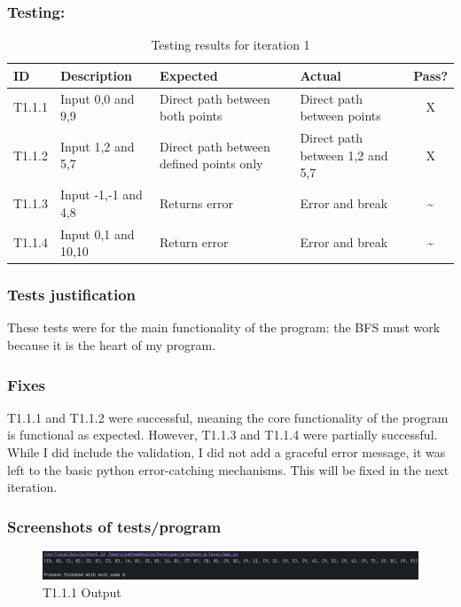 \subsubsection{Testing:}
\begin{table}[htbp]
\centering
\begin{tabularx}{\textwidth}{|l|X|p{3.5cm}|p{3.5cm}|c|}
\hline
\textbf{ID} & \textbf{Description} & \textbf{Expected} & \textbf{Actual} & \textbf{Pass?} \\
\hline
T1.1.1 & Input 0,0 and 9,9 & Direct path between both points & Direct path between points & X \\
\hline
T1.1.2 & Input 1,2 and 5,7 & Direct path between defined points only & Direct path between 1,2 and 5,7 & X \\
\hline
T1.1.3 & Input -1,-1 and 4,8 & Returns error & Error and break & \~{} \\
\hline
T1.1.4 & Input 0,1 and 10,10 & Return error & Error and break & \~{} \\
\hline

\end{tabularx}
\caption{Testing results for iteration 1}
\end{table}

\subsubsection{Tests justification}
These tests were for the main functionality of the program: the BFS must work because it is the heart of my program.
\subsubsection{Fixes}
T1.1.1 and T1.1.2 were successful, meaning the core functionality of the program is functional as expected. However, T1.1.3 and T1.1.4 were partially successful. While I did include the validation, I did not add a graceful error message, it was left to the basic python error-catching mechanisms. This will be fixed in the next iteration.

\newpage

\subsubsection{Screenshots of tests/program}

\begin{figure}[htbp!]
    \centering
    \includegraphics[width=1\linewidth]{Images/t1.1.png}
    \caption{T1.1.1 Output}
    \label{fig:enter-label}
\end{figure}

